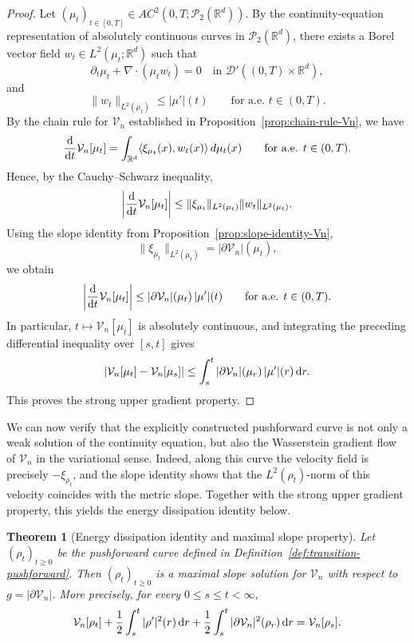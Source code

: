 \documentclass[11pt,reqno]{amsart}
\numberwithin{figure}{section}
\def\d {{\partial}}
\def\d{\mathrm{d}}
\renewcommand{\d}{  {\textup{d}} }
\newtheorem{theorem}{Theorem}[section]
\begin{document}
\begin{proof}
Let $(\mu_t)_{t\in[0,T]}\in AC^2(0,T;\mathcal P_2(\mathbb R^d))$. By the
continuity-equation representation of absolutely continuous curves in
$\mathcal P_2(\mathbb R^d)$, there exists a Borel vector field
$w_t\in L^2(\mu_t;\mathbb R^d)$ such that
\[
\partial_t\mu_t+\nabla\cdot(\mu_t w_t)=0
\quad\text{in }\mathcal D'((0,T)\times\mathbb R^d),
\]
and
\[
\|w_t\|_{L^2(\mu_t)}\le |\mu'|(t)
\qquad\text{for a.e. }t\in(0,T).
\]
By the chain rule for $\mathcal V_n$ established in
Proposition~\ref{prop:chain-rule-Vn}, we have
\[
\frac{\d}{\d t}\mathcal V_n[\mu_t]
=
\int_{\mathbb R^d}
\langle \xi_{\mu_t}(x),w_t(x)\rangle\,d\mu_t(x)
\qquad\text{for a.e. }t\in(0,T).
\]
Hence, by the Cauchy--Schwarz inequality,
\[
\left|\frac{\d}{\d t}\mathcal V_n[\mu_t]\right|
\le
\|\xi_{\mu_t}\|_{L^2(\mu_t)}
\|w_t\|_{L^2(\mu_t)}.
\]
Using the slope identity from Proposition~\ref{prop:slope-identity-Vn},
\[
\|\xi_{\mu_t}\|_{L^2(\mu_t)}
=
|\partial \mathcal V_n|(\mu_t),
\]
we obtain
\[
\left|\frac{\d}{\d t}\mathcal V_n[\mu_t]\right|
\le
|\partial \mathcal V_n|(\mu_t)\,|\mu'|(t)
\qquad\text{for a.e. }t\in(0,T).
\]
In particular, $t\mapsto \mathcal V_n[\mu_t]$ is absolutely continuous, and
integrating the preceding differential inequality over $[s,t]$ gives
\[
|\mathcal V_n[\mu_t]-\mathcal V_n[\mu_s]|
\le
\int_s^t
|\partial \mathcal V_n|(\mu_r)\,|\mu'|(r)\,\d r .
\]
This proves the strong upper gradient property.
\end{proof}

We can now verify that the explicitly constructed pushforward curve is not
only a weak solution of the continuity equation, but also the Wasserstein
gradient flow of $\mathcal V_n$ in the variational sense. Indeed, along this
curve the velocity field is precisely $-\xi_{\rho_t}$, and the slope identity
shows that the $L^2(\rho_t)$-norm of this velocity coincides with the metric
slope. Together with the strong upper gradient property, this yields the
energy dissipation identity below.

\begin{theorem}[Energy dissipation identity and maximal slope property]
\label{thm:maximal-slope-property}
Let $(\rho_t)_{t\ge0}$ be the pushforward curve defined in
Definition~\ref{def:transition-pushforward}. Then $(\rho_t)_{t\ge0}$ is a
maximal slope solution for $\mathcal V_n$ with respect to
$g=|\partial\mathcal V_n|$. More precisely, for every $0\le s\le t<\infty$,
\[
\mathcal V_n[\rho_t]
+
\frac12\int_s^t |\rho'|^2(r)\,\d r
+
\frac12\int_s^t |\partial\mathcal V_n|^2(\rho_r)\,\d r
=
\mathcal V_n[\rho_s].
\]
\end{theorem}
\end{document}

